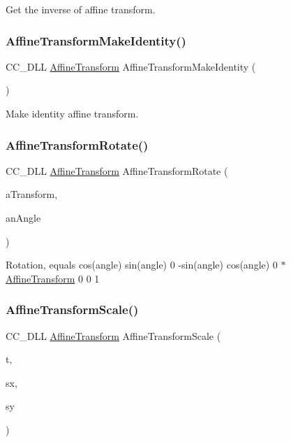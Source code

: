 Get the inverse of affine transform. \mbox{\label{group__base_ga7b484613387f6495c8efc75123f9c347}} 
\subsubsection{\texorpdfstring{Affine\+Transform\+Make\+Identity()}{AffineTransformMakeIdentity()}}
{\footnotesize\ttfamily C\+C\+\_\+\+D\+LL \hyperlink{structAffineTransform}{Affine\+Transform} Affine\+Transform\+Make\+Identity (\begin{DoxyParamCaption}{ }\end{DoxyParamCaption})}

Make identity affine transform. \mbox{\label{group__base_gaa8df41d4f248108273bcea0a0aab588a}} 
\subsubsection{\texorpdfstring{Affine\+Transform\+Rotate()}{AffineTransformRotate()}}
{\footnotesize\ttfamily C\+C\+\_\+\+D\+LL \hyperlink{structAffineTransform}{Affine\+Transform} Affine\+Transform\+Rotate (\begin{DoxyParamCaption}\item[{const \hyperlink{structAffineTransform}{Affine\+Transform} \&}]{a\+Transform,  }\item[{float}]{an\+Angle }\end{DoxyParamCaption})}

Rotation, equals cos(angle) sin(angle) 0 -\/sin(angle) cos(angle) 0 $\ast$ \hyperlink{structAffineTransform}{Affine\+Transform} 0 0 1 \mbox{\label{group__base_gacf87a20201f4b20eac393af2f897ead0}} 
\subsubsection{\texorpdfstring{Affine\+Transform\+Scale()}{AffineTransformScale()}}
{\footnotesize\ttfamily C\+C\+\_\+\+D\+LL \hyperlink{structAffineTransform}{Affine\+Transform} Affine\+Transform\+Scale (\begin{DoxyParamCaption}\item[{const \hyperlink{structAffineTransform}{Affine\+Transform} \&}]{t,  }\item[{float}]{sx,  }\item[{float}]{sy }\end{DoxyParamCaption})}

